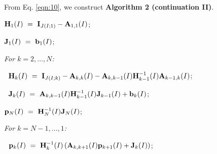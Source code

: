 \documentclass[preprint,12pt]{elsarticle}
\begin{document}
\par\noindent From Eq. \eqref{eqn:10}, we construct {\bf Algorithm 2 (continuation II)}.\\

\vspace{0.5cm}
\par {}
\begin{description}
  \item ${\bf H}_1(I) ~=~ {\bf I}_{J(I;1)}-{\bf A}_{1,1}(I)$;
  \item ${\bf J}_1(I) ~=~ {\bf b}_1(I)$;
  \item \it For $k=2,\dots,N$:
  \item $~$\hspace{0.5cm} ${\bf H}_k(I) ~=~ {\bf I}_{J(I;k)}-{\bf A}_{k,k}(I)-{\bf A}_{k,k-1}(I){\bf H}_{k-1}^{-1}(I){\bf A}_{k-1,k}(I)$;
  \item $~$\hspace{0.5cm} ${\bf J}_k(I) ~=~ {\bf A}_{k,k-1}(I){\bf H}_{k-1}^{-1}(I){\bf J}_{k-1}(I)+{\bf b}_k(I)$;
  \item ${\bf p}_{N}(I) ~=~ {\bf H}_{N}^{-1}(I){\bf J}_{N}(I)$;
  \item \it For $k=N-1,\dots,1$:
  \item $~$\hspace{0.5cm} ${\bf p}_k(I) ~=~ {\bf H}_k^{-1}(I)\left({\bf A}_{k,k+1}(I){\bf p}_{k+1}(I)+{\bf J}_k(I)\right)$;
\end{description}
\vspace{0.5cm}
\end{document}
